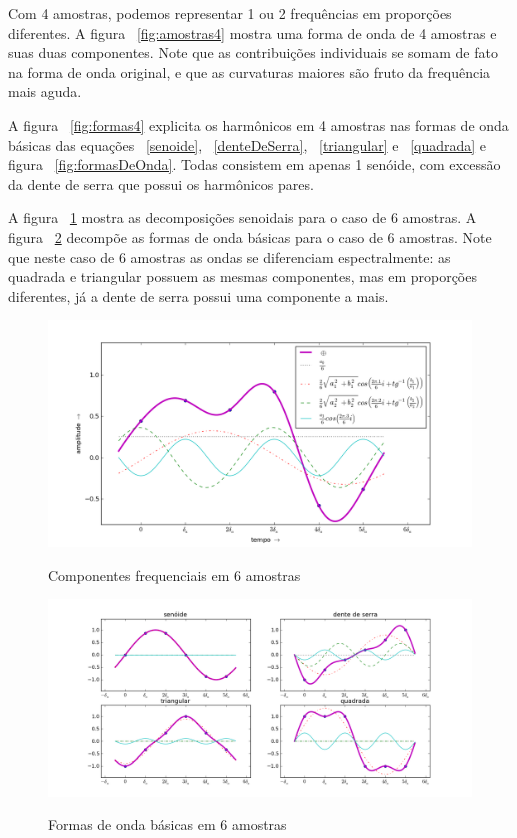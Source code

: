 Com 4 amostras, podemos representar 1 ou 2 frequências em proporções diferentes. A figura ~\ref{fig:amostras4} mostra uma forma de onda de 4 amostras e suas duas componentes. Note que as contribuições individuais se somam de fato na forma de onda original, e que as curvaturas maiores são fruto da frequência mais aguda.

A figura ~\ref{fig:formas4} explicita os harmônicos em 4 amostras nas formas de onda básicas das equações ~\ref{senoide}, ~\ref{denteDeSerra}, ~\ref{triangular} e ~\ref{quadrada} e figura ~\ref{fig:formasDeOnda}. Todas consistem em apenas 1 senóide, com excessão da dente de serra que possui os harmônicos pares.


A figura ~\ref{fig:amostras6} mostra as decomposições senoidais para o caso de 6 amostras. A figura ~\ref{fig:formas6} decompõe as formas de onda básicas para o caso de 6 amostras.
 Note que neste caso de 6 amostras as ondas se diferenciam espectralmente: as quadrada e triangular possuem as mesmas componentes, mas em proporções diferentes, já a dente de serra possui uma componente a mais.

\begin{figure}[h!]
    \centering
    \caption{Componentes frequenciais em 6 amostras}
        \includegraphics[width=\textwidth]{figuras/amostras6}
        \label{fig:amostras6}
\end{figure}

\begin{figure}[h!]
    \centering
    \caption{Formas de onda básicas em 6 amostras}
        \includegraphics[width=\textwidth]{figuras/amostras6formas___}
        \label{fig:formas6}
\end{figure}

